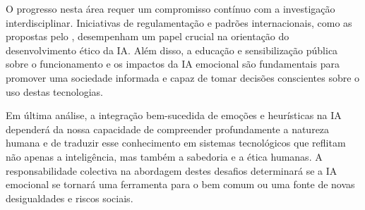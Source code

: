 \documentclass[a4paper,12pt]{report}
\begin{document}
	O progresso nesta área requer um compromisso contínuo com a investigação interdisciplinar. Iniciativas de regulamentação e padrões internacionais, como as propostas pelo \textcite{ieee2019}, desempenham um papel crucial na orientação do desenvolvimento ético da IA. Além disso, a educação e sensibilização pública sobre o funcionamento e os impactos da IA emocional são fundamentais para promover uma sociedade informada e capaz de tomar decisões conscientes sobre o uso destas tecnologias.
	
	Em última análise, a integração bem-sucedida de emoções e heurísticas na IA dependerá da nossa capacidade de compreender profundamente a natureza humana e de traduzir esse conhecimento em sistemas tecnológicos que reflitam não apenas a inteligência, mas também a sabedoria e a ética humanas. A responsabilidade colectiva na abordagem destes desafios determinará se a IA emocional se tornará uma ferramenta para o bem comum ou uma fonte de novas desigualdades e riscos sociais.
	
	\newpage
	
	\printbibliography
	
\end{document}
